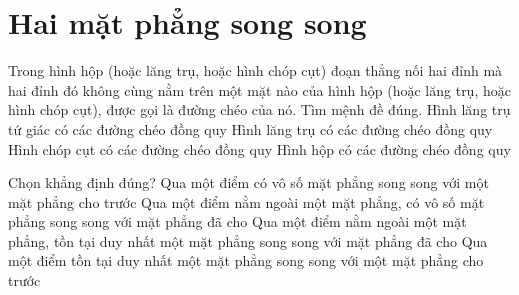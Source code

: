 \section{Hai mặt phẳng song song}
\begin{ex}%
	Trong hình hộp (hoặc lăng trụ, hoặc hình chóp cụt) đoạn thẳng nối hai đỉnh mà hai đỉnh đó không cùng nằm trên một mặt nào của hình hộp (hoặc lăng trụ, hoặc hình chóp cụt), được gọi là đường chéo của nó. Tìm mệnh đề đúng.
	\choice
	{Hình lăng trụ tứ giác có các đường chéo đồng quy}
	{Hình lăng trụ có các đường chéo đồng quy}
	{Hình chóp cụt có các đường chéo đồng quy}
	{\True Hình hộp có các đường chéo đồng quy}
\end{ex}
\begin{ex}%
	Chọn khẳng định đúng?
	\choice
	{ Qua một điểm có vô số mặt phẳng song song với một mặt phẳng cho trước}
	{ Qua một điểm nằm ngoài một mặt phẳng, có vô số mặt phẳng song song với mặt phẳng đã cho}
	{\True Qua một điểm nằm ngoài một mặt phẳng, tồn tại duy nhất một mặt phẳng song song với mặt phẳng đã cho}
	{Qua một điểm tồn tại duy nhất một mặt phẳng song song với một mặt phẳng cho trước}
\end{ex}
